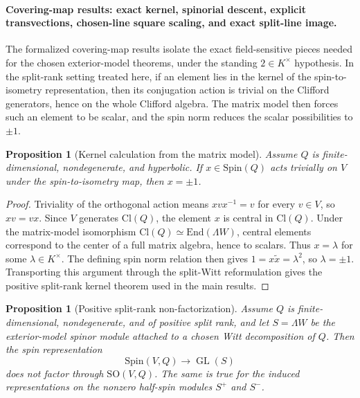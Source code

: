 \documentclass{birkjour}
\theoremstyle{plain}
\newtheorem{proposition}[theorem]{Proposition}
\theoremstyle{definition}
\theoremstyle{remark}
\newcommand{\Cl}{\mathrm{Cl}}
\newcommand{\Spin}{\mathrm{Spin}}
\newcommand{\SO}{\mathrm{SO}}
\newcommand{\End}{\mathrm{End}}
\newcommand{\wedgeW}{\Lambda W}
\begin{document}
\paragraph{Covering-map results: exact kernel, spinorial descent, explicit transvections, chosen-line square scaling, and exact split-line image.}
The formalized covering-map results isolate the exact field-sensitive pieces
needed for the chosen exterior-model theorems, under the standing
$2\in K^\times$ hypothesis. In the split-rank setting treated here, if an
element lies in the kernel of the spin-to-isometry representation, then its
conjugation action is trivial on the Clifford generators, hence on the whole
Clifford algebra. The matrix model then forces such an element to be scalar,
and the spin norm reduces the scalar possibilities to $\pm1$.

\begin{proposition}[Kernel calculation from the matrix model]
\label{prop:kernel-from-matrix}
Assume $Q$ is finite-dimensional, nondegenerate, and hyperbolic. If
$x\in \Spin(Q)$ acts trivially on $V$ under the spin-to-isometry map, then
$x=\pm1$.
\end{proposition}

\begin{proof}
Triviality of the orthogonal action means $xvx^{-1}=v$ for every $v\in V$, so
$xv=vx$. Since $V$ generates $\Cl(Q)$, the element $x$ is central in
$\Cl(Q)$. Under the matrix-model isomorphism
$\Cl(Q)\simeq \End(\wedgeW)$, central elements correspond to the center of a
full matrix algebra, hence to scalars. Thus $x=\lambda$ for some
$\lambda\in K^\times$. The defining spin norm relation then gives
$1=x\tilde x=\lambda^2$, so $\lambda=\pm1$. Transporting this argument through
the split-Witt reformulation gives the positive split-rank kernel theorem used in the
main results.
\end{proof}

\begin{proposition}[Positive split-rank non-factorization]
\label{prop:nonfactorization}
Assume $Q$ is finite-dimensional, nondegenerate, and of positive split rank,
and let $S=\wedgeW$ be the exterior-model spinor module attached to a
chosen Witt decomposition of $Q$. Then the spin representation
\[
  \Spin(V,Q)\to \operatorname{GL}(S)
\]
does not factor through $\SO(V,Q)$. The same is true for the induced
representations on the nonzero half-spin modules $S^+$ and $S^-$.
\end{proposition}
\end{document}
